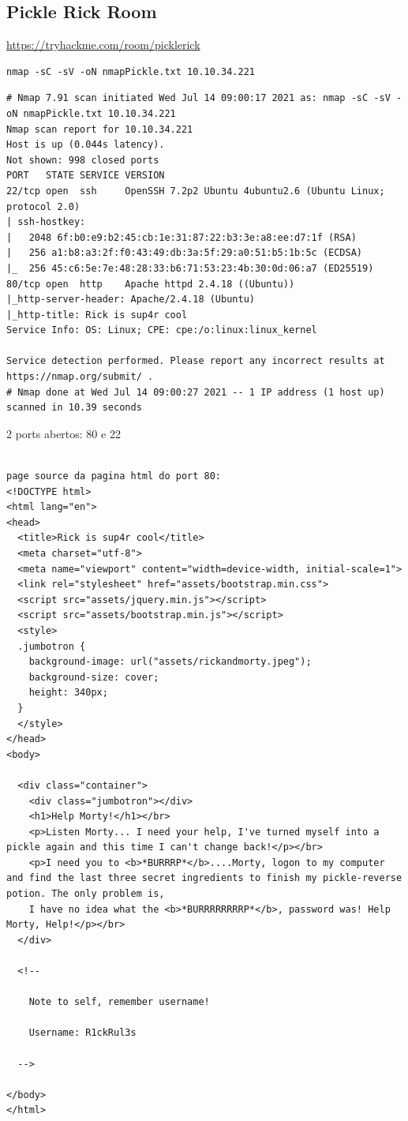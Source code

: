 \documentclass[11pt]{article}
\begin{document}
\newpage

\subsection{Pickle Rick Room }

\url{https://tryhackme.com/room/picklerick}

 \begin{verbatim}
nmap -sC -sV -oN nmapPickle.txt 10.10.34.221
\end{verbatim}

\begin{lstlisting}
# Nmap 7.91 scan initiated Wed Jul 14 09:00:17 2021 as: nmap -sC -sV -oN nmapPickle.txt 10.10.34.221
Nmap scan report for 10.10.34.221
Host is up (0.044s latency).
Not shown: 998 closed ports
PORT   STATE SERVICE VERSION
22/tcp open  ssh     OpenSSH 7.2p2 Ubuntu 4ubuntu2.6 (Ubuntu Linux; protocol 2.0)
| ssh-hostkey: 
|   2048 6f:b0:e9:b2:45:cb:1e:31:87:22:b3:3e:a8:ee:d7:1f (RSA)
|   256 a1:b8:a3:2f:f0:43:49:db:3a:5f:29:a0:51:b5:1b:5c (ECDSA)
|_  256 45:c6:5e:7e:48:28:33:b6:71:53:23:4b:30:0d:06:a7 (ED25519)
80/tcp open  http    Apache httpd 2.4.18 ((Ubuntu))
|_http-server-header: Apache/2.4.18 (Ubuntu)
|_http-title: Rick is sup4r cool
Service Info: OS: Linux; CPE: cpe:/o:linux:linux_kernel

Service detection performed. Please report any incorrect results at https://nmap.org/submit/ .
# Nmap done at Wed Jul 14 09:00:27 2021 -- 1 IP address (1 host up) scanned in 10.39 seconds
\end{lstlisting}


2 ports abertos: 80 e 22

\begin{lstlisting}

page source da pagina html do port 80:
<!DOCTYPE html>
<html lang="en">
<head>
  <title>Rick is sup4r cool</title>
  <meta charset="utf-8">
  <meta name="viewport" content="width=device-width, initial-scale=1">
  <link rel="stylesheet" href="assets/bootstrap.min.css">
  <script src="assets/jquery.min.js"></script>
  <script src="assets/bootstrap.min.js"></script>
  <style>
  .jumbotron {
    background-image: url("assets/rickandmorty.jpeg");
    background-size: cover;
    height: 340px;
  }
  </style>
</head>
<body>

  <div class="container">
    <div class="jumbotron"></div>
    <h1>Help Morty!</h1></br>
    <p>Listen Morty... I need your help, I've turned myself into a pickle again and this time I can't change back!</p></br>
    <p>I need you to <b>*BURRRP*</b>....Morty, logon to my computer and find the last three secret ingredients to finish my pickle-reverse potion. The only problem is,
    I have no idea what the <b>*BURRRRRRRRP*</b>, password was! Help Morty, Help!</p></br>
  </div>

  <!--

    Note to self, remember username!

    Username: R1ckRul3s

  -->

</body>
</html>
\end{lstlisting}
\end{document}
